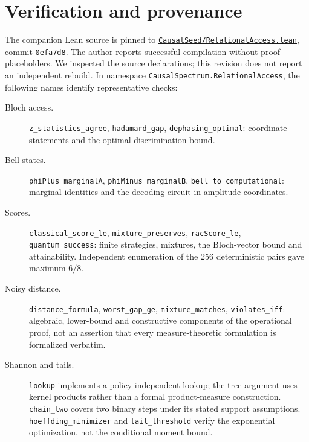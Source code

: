 \documentclass[11pt,a4paper]{article}
\theoremstyle{definition}
\begin{document}
\section*{Verification and provenance}
The companion Lean source is pinned to
\href{https://github.com/jendamikulik/finite-Shannon-theorem/blob/0efa7d8/CausalSeed/RelationalAccess.lean}{\texttt{CausalSeed/RelationalAccess.lean}, commit \texttt{0efa7d8}}.
The author reports successful compilation without proof placeholders. We inspected the source declarations; this revision does not report an independent rebuild. In namespace \texttt{CausalSpectrum.RelationalAccess}, the following names identify representative checks:

\setlength{\emergencystretch}{1em}
\begin{description}
\item[Bloch access.] \texttt{z\_statistics\_agree}, \texttt{hadamard\_gap}, \texttt{dephasing\_optimal}: coordinate statements and the optimal discrimination bound.
\item[Bell states.] \texttt{phiPlus\_marginalA}, \texttt{phiMinus\_marginalB}, \texttt{bell\_to\_computational}: marginal identities and the decoding circuit in amplitude coordinates.
\item[Scores.] \texttt{classical\_score\_le}, \texttt{mixture\_preserves}, \texttt{racScore\_le}, \texttt{quantum\_success}: finite strategies, mixtures, the Bloch-vector bound and attainability. Independent enumeration of the 256 deterministic pairs gave maximum $6/8$.
\item[Noisy distance.] \texttt{distance\_formula}, \texttt{worst\_gap\_ge}, \texttt{mixture\_matches}, \texttt{violates\_iff}: algebraic, lower-bound and constructive components of the operational proof, not an assertion that every measure-theoretic formulation is formalized verbatim.
\item[Shannon and tails.] \texttt{lookup} implements a policy-independent lookup; the tree argument uses kernel products rather than a formal product-measure construction. \texttt{chain\_two} covers two binary steps under its stated support assumptions. \texttt{hoeffding\_minimizer} and \texttt{tail\_threshold} verify the exponential optimization, not the conditional moment bound.
\end{description}
\end{document}
